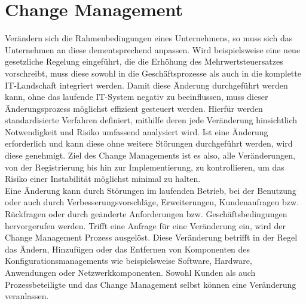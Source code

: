 \chapter{Change Management}
\vspace{-0.4cm}
Verändern sich die Rahmenbedingungen eines Unternehmens, so muss sich das Unternehmen an diese dementsprechend anpassen. Wird beispielsweise eine neue gesetzliche Regelung eingeführt, die die Erhöhung des Mehrwertsteuersatzes vorschreibt, muss diese sowohl in die Geschäftsprozesse als auch in die komplette IT-Landschaft integriert werden. Damit diese Änderung durchgeführt werden kann, ohne das laufende IT-System negativ zu beeinflussen, muss dieser Änderungsprozess möglichst effizient gesteuert werden. Hierfür werden standardisierte Verfahren definiert, mithilfe deren jede Veränderung hinsichtlich Notwendigkeit und Risiko umfassend analysiert wird. Ist eine Änderung erforderlich und kann diese ohne weitere Störungen durchgeführt werden, wird diese  genehmigt. Ziel des Change Managements ist es also, alle Veränderungen, von der Registrierung bis hin zur Implementierung, zu kontrollieren, um das Risiko einer Instabilität möglichst minimal zu halten.
\\
Eine Änderung kann durch Störungen im laufenden Betrieb, bei der Benutzung oder auch durch Verbesserungsvorschläge, Erweiterungen, Kundenanfragen bzw. Rückfragen oder durch geänderte Anforderungen bzw. Geschäftsbedingungen hervorgerufen werden. Trifft eine Anfrage für eine Veränderung ein, wird der Change Management Prozess ausgelöst. Diese Veränderung betrifft in der Regel das Ändern, Hinzufügen oder das Entfernen von Komponenten des Konfigurationsmanagements wie beispielsweise Software, Hardware, Anwendungen oder Netzwerkkomponenten. Sowohl Kunden als auch Prozessbeteiligte und das Change Management selbst können eine Veränderung veranlassen. 
\vspace{-0.1cm}
